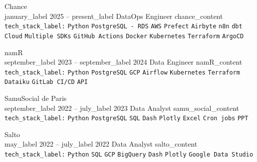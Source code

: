 \documentclass[9pt]{developercv} %
\begin{document}
    \begin{entrylist}
        \entry
        {Chance                         \\\footnotesize{{{january_label}} 2025 -- {{present_label}} }}
        {DataOps Engineer}
        {}
        {{{chance_content}}\\
        \texttt{{{tech_stack_label}}:}
        \texttt{Python}\slashsep
        \texttt{PostgreSQL - RDS}\slashsep
        \texttt{AWS}\slashsep
        \texttt{Prefect}\slashsep
        \texttt{Airbyte}\slashsep
        \texttt{n8n}\slashsep
        \texttt{dbt Cloud}\slashsep
        \texttt{Multiple SDKs}\slashsep
        \texttt{GitHub Actions}\slashsep
        \texttt{Docker}\slashsep
        \texttt{Kubernetes}\slashsep
        \texttt{Terraform}\slashsep
        \texttt{ArgoCD}                  \\
        }

        \entry
        {namR                         \\\footnotesize{{{september_label}} 2023 -- {{september_label}} 2024}}
        {Data Engineer}
        {}
        {{{namR_content}}\\
        \texttt{{{tech_stack_label}}:}
        \texttt{Python}\slashsep
        \texttt{PostgreSQL}\slashsep
        \texttt{GCP}\slashsep
        \texttt{Airflow}\slashsep
        \texttt{Kubernetes}\slashsep
        \texttt{Terraform}\slashsep
        \texttt{Dataiku}\slashsep
        \texttt{GitLab CI/CD}\slashsep
        \texttt{API}                  \\
        }

        \entry
        {SamuSocial de Paris          \\\footnotesize{{{september_label}} 2022 -- {{july_label}} 2023}}
        {Data Analyst}
        {}
        {{{samu_social_content}}\\
        \texttt{{{tech_stack_label}}:}
        \texttt{Python}\slashsep
        \texttt{PostgreSQL}\slashsep
        \texttt{SQL}\slashsep
        \texttt{Dash}\slashsep
        \texttt{Plotly}\slashsep
        \texttt{Excel}\slashsep
        \texttt{Cron jobs}\slashsep
        \texttt{PPT}                  \\
        }

        \entry
        {Salto                        \\\footnotesize{{{may_label}} 2022 -- {{july_label}} 2022}}
        {Data Analyst}
        {}
        {{{salto_content}}\\
        \texttt{{{tech_stack_label}}:}
        \texttt{Python}\slashsep
        \texttt{SQL}\slashsep
        \texttt{GCP}\slashsep
        \texttt{BigQuery}\slashsep
        \texttt{Dash}\slashsep
        \texttt{Plotly}\slashsep
        \texttt{Google Data Studio}   \\
        }


\end{entrylist}
\end{document}
